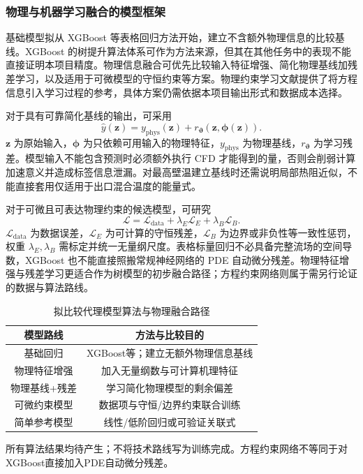 \documentclass[UTF8]{midterm}
\begin{document}
\subsubsection{物理与机器学习融合的模型框架}
基础模型拟从 XGBoost 等表格回归方法开始，建立不含额外物理信息的比较基线。XGBoost 的树提升算法体系可作为方法来源\cite{chen2016}，但其在其他任务中的表现不能直接证明本项目精度。物理信息融合可优先比较输入特征增强、简化物理基线加残差学习，以及适用于可微模型的守恒约束等方案。物理约束学习文献提供了将方程信息引入学习过程的参考\cite{raissi2017}，具体方案仍需依据本项目输出形式和数据成本选择。

对于具有可靠简化基线的输出，可采用
\begin{equation}
\widehat y(\bm z)=y_{\mathrm{phys}}(\bm z)+r_{\boldsymbol\vartheta}(\bm z,\bm\phi(\bm z)).\label{eq:residualmodel}
\end{equation}
$\bm z$ 为原始输入，$\bm\phi$ 为只依赖可用输入的物理特征，$y_{\mathrm{phys}}$ 为物理基线，$r_{\boldsymbol\vartheta}$ 为学习残差。模型输入不能包含预测时必须额外执行 CFD 才能得到的量，否则会削弱计算加速意义并造成标签信息泄漏。对最高壁温建立基线时还需说明局部热阻近似，不能直接套用仅适用于出口混合温度的能量式。

对于可微且可表达物理约束的候选模型，可研究
\begin{equation}
\mathcal L=\mathcal L_{\mathrm{data}}+\lambda_E\mathcal L_E+\lambda_B\mathcal L_B.\label{eq:loss}
\end{equation}
$\mathcal L_{\mathrm{data}}$ 为数据误差，$\mathcal L_E$ 为可计算的守恒残差，$\mathcal L_B$ 为边界或非负性等一致性惩罚，权重 $\lambda_E,\lambda_B$ 需标定并统一无量纲尺度。表格标量回归不必具备完整流场的空间导数，XGBoost 也不能直接照搬常规神经网络的 PDE 自动微分残差。物理特征增强与残差学习更适合作为树模型的初步融合路径；方程约束网络则属于需另行论证的数据与算法路线。
\begin{table}[!htbp]
\centering\small
\caption{拟比较代理模型算法与物理融合路径}\label{tab:13}
\begin{tabularx}{\linewidth}{CC}
\toprule
{} 模型路线 & 方法与比较目的 \\
\midrule
基础回归 & XGBoost等；建立无额外物理信息基线 \\
物理特征增强 & 加入无量纲数与可计算机理特征 \\
物理基线+残差 & 学习简化物理模型的剩余偏差 \\
可微约束模型 & 数据项与守恒/边界约束联合训练 \\
简单参考模型 & 线性/低阶回归或可验证关联式 \\
\bottomrule
\end{tabularx}
\par\smallskip\begin{minipage}{\linewidth}\footnotesize 所有算法结果均待产生；不将技术路线写为训练完成。方程约束网络不等同于对XGBoost直接加入PDE自动微分残差。\end{minipage}
\end{table}
\end{document}
